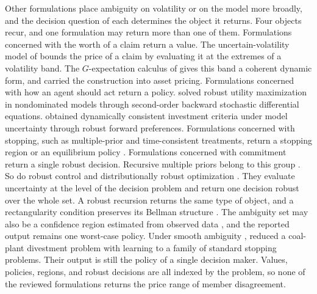 Other formulations place ambiguity on volatility or on the model more broadly, and the decision question of each determines the object it returns. Four objects recur, and one formulation may return more than one of them. Formulations concerned with the worth of a claim return a value. The uncertain-volatility model of \citet{Avellaneda1995} bounds the price of a claim by evaluating it at the extremes of a volatility band. The $G$-expectation calculus of \citet{Peng2019} gives this band a coherent dynamic form, and \citet{EpsteinJi2013} carried the construction into asset pricing. Formulations concerned with how an agent should act return a policy. \citet{Matoussi2015} solved robust utility maximization in nondominated models through second-order backward stochastic differential equations. \citet{Kallblad2018} obtained dynamically consistent investment criteria under model uncertainty through robust forward preferences. Formulations concerned with stopping, such as multiple-prior and time-consistent treatments, return a stopping region or an equilibrium policy \citep{Riedel2009,HuangYu2021}. Formulations concerned with commitment return a single robust decision. Recursive multiple priors belong to this group \citep{ChenEpstein2002,EpsteinSchneider2003}. So do robust control \citep{HansenSargent2001} and distributionally robust optimization \citep{MohajerinKuhn2018}. They evaluate uncertainty at the level of the decision problem and return one decision robust over the whole set. A robust recursion returns the same type of object, and a rectangularity condition preserves its Bellman structure \citep{Iyengar2005}. The ambiguity set may also be a confidence region estimated from observed data \citep{Wiesemann2013}, and the reported output remains one worst-case policy. Under smooth ambiguity \citep{Klibanoff2005}, \citet{MazzonTankov2024} reduced a coal-plant divestment problem with learning to a family of standard stopping problems. Their output is still the policy of a single decision maker. Values, policies, regions, and robust decisions are all indexed by the problem, so none of the reviewed formulations returns the price range of member disagreement.

